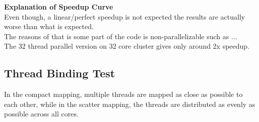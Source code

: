 \documentclass{article}
\newcommand\tab[1][0.5cm]{\hspace*{#1}}
\begin{document}
\textbf{Explanation of Speedup Curve}
\\
\tab Even though, a linear/perfect speedup is not expected the results are actually worse than what is expected.\\
The reasons of that is some part of the code is non-parallelizable such as ...\\
The 32 thread parallel version on 32 core cluster gives only around 2x speedup.\\

\newpage

\subsection{Thread Binding Test}
\tab In the compact mapping, multiple threads are mapped as close as possible to each other, 
while in the scatter mapping, the threads are distributed as evenly as possible across all cores. 
\end{document}
